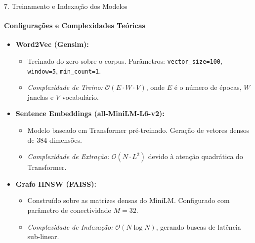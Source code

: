 \documentclass[10pt, aspectratio=169]{beamer}
\begin{document}
\begin{frame}{7. Treinamento e Indexação dos Modelos}
    \framesubtitle{Configurações e Complexidades Teóricas}
    \begin{itemize}
        \item \textbf{Word2Vec (Gensim):} 
        \begin{itemize}
            \item Treinado do zero sobre o corpus. Parâmetros: \texttt{vector\_size=100}, \texttt{window=5}, \texttt{min\_count=1}.
            \item \textit{Complexidade de Treino:} $\mathcal{O}(E \cdot W \cdot V)$, onde $E$ é o número de épocas, $W$ janelas e $V$ vocabulário.
        \end{itemize}
        \vspace{0.1cm}
        \item \textbf{Sentence Embeddings (all-MiniLM-L6-v2):}
        \begin{itemize}
            \item Modelo baseado em Transformer pré-treinado. Geração de vetores densos de 384 dimensões.
            \item \textit{Complexidade de Extração:} $\mathcal{O}(N \cdot L^2)$ devido à atenção quadrática do Transformer.
        \end{itemize}
        \vspace{0.1cm}
        \item \textbf{Grafo HNSW (FAISS):}
        \begin{itemize}
            \item Construído sobre as matrizes densas do MiniLM. Configurado com parâmetro de conectividade $M=32$.
            \item \textit{Complexidade de Indexação:} $\mathcal{O}(N \log N)$, gerando buscas de latência sub-linear.
        \end{itemize}
    \end{itemize}
\end{frame}
\end{document}
